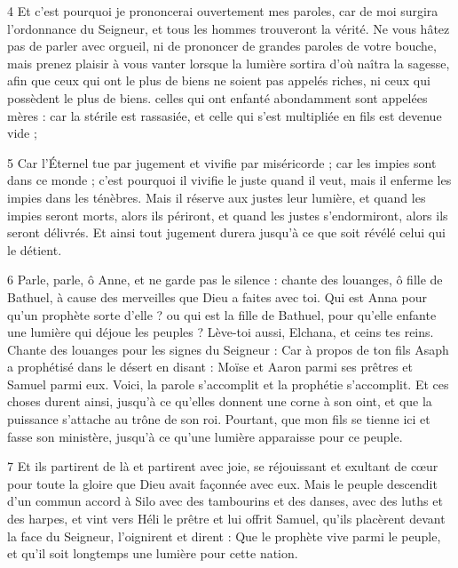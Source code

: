 \par 4 Et c'est pourquoi je prononcerai ouvertement mes paroles, car de moi surgira l'ordonnance du Seigneur, et tous les hommes trouveront la vérité. Ne vous hâtez pas de parler avec orgueil, ni de prononcer de grandes paroles de votre bouche, mais prenez plaisir à vous vanter lorsque la lumière sortira d'où naîtra la sagesse, afin que ceux qui ont le plus de biens ne soient pas appelés riches, ni ceux qui possèdent le plus de biens. celles qui ont enfanté abondamment sont appelées mères : car la stérile est rassasiée, et celle qui s'est multipliée en fils est devenue vide ;

\par 5 Car l'Éternel tue par jugement et vivifie par miséricorde ; car les impies sont dans ce monde ; c'est pourquoi il vivifie le juste quand il veut, mais il enferme les impies dans les ténèbres. Mais il réserve aux justes leur lumière, et quand les impies seront morts, alors ils périront, et quand les justes s'endormiront, alors ils seront délivrés. Et ainsi tout jugement durera jusqu'à ce que soit révélé celui qui le détient.

\par 6 Parle, parle, ô Anne, et ne garde pas le silence : chante des louanges, ô fille de Bathuel, à cause des merveilles que Dieu a faites avec toi. Qui est Anna pour qu'un prophète sorte d'elle ? ou qui est la fille de Bathuel, pour qu'elle enfante une lumière qui déjoue les peuples ? Lève-toi aussi, Elchana, et ceins tes reins. Chante des louanges pour les signes du Seigneur : Car à propos de ton fils Asaph a prophétisé dans le désert en disant : Moïse et Aaron parmi ses prêtres et Samuel parmi eux. Voici, la parole s'accomplit et la prophétie s'accomplit. Et ces choses durent ainsi, jusqu'à ce qu'elles donnent une corne à son oint, et que la puissance s'attache au trône de son roi. Pourtant, que mon fils se tienne ici et fasse son ministère, jusqu'à ce qu'une lumière apparaisse pour ce peuple.

\par 7 Et ils partirent de là et partirent avec joie, se réjouissant et exultant de cœur pour toute la gloire que Dieu avait façonnée avec eux. Mais le peuple descendit d'un commun accord à Silo avec des tambourins et des danses, avec des luths et des harpes, et vint vers Héli le prêtre et lui offrit Samuel, qu'ils placèrent devant la face du Seigneur, l'oignirent et dirent : Que le prophète vive parmi le peuple, et qu'il soit longtemps une lumière pour cette nation.


